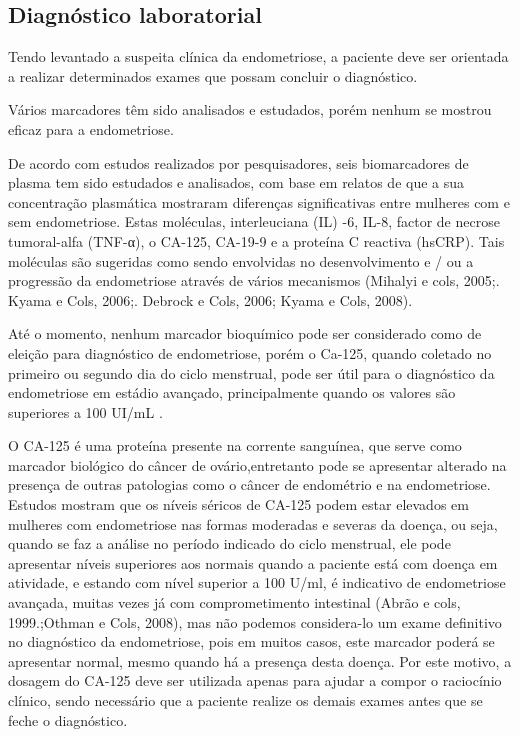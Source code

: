 \documentclass[12pt]{article} %
\begin{document}
\subsection{Diagnóstico laboratorial}

Tendo levantado a suspeita clínica da endometriose, a paciente deve ser orientada a realizar determinados exames que possam concluir o diagnóstico.

Vários marcadores têm sido analisados e estudados, porém nenhum se mostrou eficaz para a endometriose.

De acordo com estudos realizados por pesquisadores, seis biomarcadores de plasma tem sido estudados e analisados, com base em relatos  de que a sua concentração plasmática mostraram diferenças significativas entre mulheres com e sem endometriose. Estas moléculas, interleuciana (IL) -6, IL-8, factor de necrose tumoral-alfa (TNF-α), o CA-125, CA-19-9 e a proteína C reactiva (hsCRP). Tais moléculas são sugeridas como sendo envolvidas no desenvolvimento e / ou a progressão da endometriose através de vários mecanismos (Mihalyi e cols, 2005;. Kyama e Cols, 2006;. Debrock e Cols, 2006; Kyama e Cols, 2008).

Até o momento, nenhum marcador
bioquímico pode ser considerado como de eleição para
diagnóstico de endometriose, porém o Ca-125, quando
coletado no primeiro ou segundo dia do ciclo menstrual, pode ser útil para o diagnóstico da endometriose em
estádio avançado, principalmente quando os valores são
superiores a 100 UI/mL .

O CA-125 é uma proteína presente na corrente sanguínea, que serve como marcador biológico do câncer de ovário,entretanto pode se apresentar alterado na presença de outras patologias como o câncer de endométrio e na endometriose. Estudos mostram que os níveis séricos de CA-125 podem estar elevados em mulheres com endometriose nas formas moderadas e severas da doença,  ou seja, quando se faz a análise no período indicado do ciclo menstrual, ele pode apresentar níveis superiores aos normais quando a paciente está com doença em atividade, e estando com nível superior a 100 U/ml, é indicativo de endometriose avançada, muitas vezes já com comprometimento intestinal (Abrão e cols, 1999.;Othman e Cols, 2008), mas não podemos considera-lo um exame definitivo no diagnóstico da endometriose, pois em muitos casos, este marcador poderá se apresentar normal, mesmo quando há a presença desta doença. Por este motivo, a dosagem do CA-125 deve ser utilizada apenas para ajudar a compor o raciocínio clínico, sendo necessário que a paciente realize os demais exames antes que se feche o diagnóstico.
\end{document}
